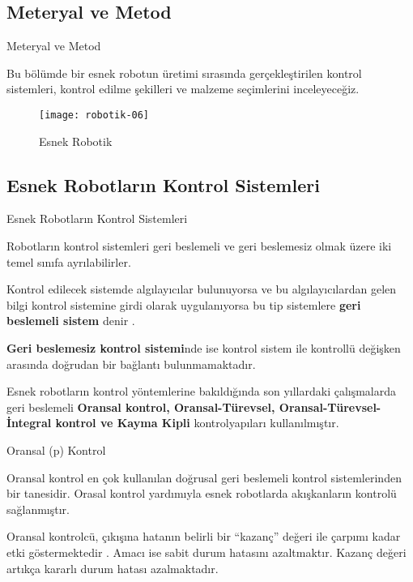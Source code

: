 \documentclass{beamer}
\begin{document}
\subsection{Meteryal ve Metod}

\begin{frame}{Meteryal ve Metod}
\begin{block}
\item Bu bölümde bir esnek robotun üretimi sırasında gerçekleştirilen kontrol sistemleri, kontrol edilme şekilleri ve malzeme seçimlerini inceleyeceğiz.
\end{block}
\begin{figure}
\texttt{[image: robotik-06]}
\caption{\label{Şekil-6} Esnek Robotik}
\end{figure}

\end{frame}

\subsection{Esnek Robotların Kontrol Sistemleri}

\begin{frame}{Esnek Robotların Kontrol Sistemleri}
\begin{block}
\item Robotların kontrol sistemleri geri beslemeli ve geri beslemesiz olmak üzere iki temel sınıfa ayrılabilirler. 

\item Kontrol edilecek sistemde algılayıcılar bulunuyorsa ve bu algılayıcılardan gelen bilgi kontrol sistemine girdi olarak uygulanıyorsa bu tip sistemlere \textbf{geri beslemeli sistem} denir .

\item \textbf{Geri beslemesiz kontrol sistemi}nde ise kontrol sistem ile kontrollü değişken arasında doğrudan bir bağlantı bulunmamaktadır. 

\item Esnek robotların kontrol yöntemlerine bakıldığında son yıllardaki çalışmalarda geri beslemeli \textbf{Oransal kontrol, Oransal-Türevsel, Oransal-Türevsel-İntegral kontrol ve Kayma Kipli} kontrolyapıları kullanılmıştır.
\end{block}
\end{frame}

\begin{frame}
\begin{block}{Oransal (p) Kontrol}
\item Oransal kontrol en çok kullanılan doğrusal geri beslemeli kontrol sistemlerinden bir tanesidir. Orasal kontrol yardımıyla esnek robotlarda akışkanların kontrolü sağlanmıştır. 

\item Oransal kontrolcü, çıkışına hatanın belirli bir “kazanç” değeri ile çarpımı kadar etki göstermektedir . Amacı ise sabit durum hatasını azaltmaktır. Kazanç değeri artıkça kararlı durum hatası azalmaktadır.
\end{block}
\end{frame}
\end{document}
